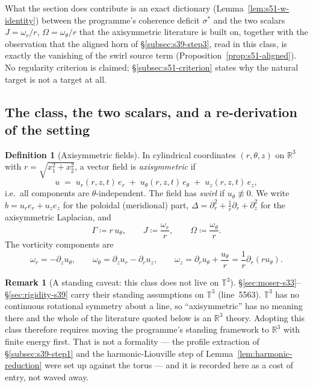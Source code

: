 \documentclass[11pt]{article}
\theoremstyle{definition}
\newtheorem{definition}[theorem]{Definition}
\newtheorem{remark}[theorem]{Remark}
\theoremstyle{remark}
\newcommand{\R}{\mathbb{R}}
\newcommand{\T}{\mathbb{T}}
\providecommand{\colonequals}{\coloneqq}
\begin{document}
\noindent What the section does contribute is an exact dictionary
(Lemma~\ref{lem:s51-w-identity}) between the programme's coherence deficit
$\sigma^*$ and the two scalars $J=\omega_r/r$, $\Omega=\omega_\theta/r$ that
the axisymmetric literature is built on, together with the observation that
the aligned horn of \S\ref{subsec:s39-step3}, read in this class, is exactly
the vanishing of the swirl source term (Proposition~\ref{prop:s51-aligned}).
No regularity criterion is claimed; \S\ref{subsec:s51-criterion} states why
the natural target is not a target at all.

\subsection{The class, the two scalars, and a re-derivation of the setting}
\label{subsec:s51-setting}

\begin{definition}[Axisymmetric fields]\label{def:s51-class}
  In cylindrical coordinates $(r,\theta,z)$ on $\R^3$ with
  $r=\sqrt{x_1^2+x_2^2}$, a vector field is \emph{axisymmetric} if
  \[
    u \;=\; u_r(r,z,t)\,e_r \;+\; u_\theta(r,z,t)\,e_\theta
      \;+\; u_z(r,z,t)\,e_z ,
  \]
  i.e.\ all components are $\theta$-independent. The field has \emph{swirl} if
  $u_\theta\not\equiv0$. We write $b=u_re_r+u_ze_z$ for the poloidal
  (meridional) part, $\Delta=\partial_r^2+\tfrac1r\partial_r+\partial_z^2$ for
  the axisymmetric Laplacian, and
  \[
    \Gamma \colonequals r\,u_\theta, \qquad
    J \colonequals \frac{\omega_r}{r}, \qquad
    \Omega \colonequals \frac{\omega_\theta}{r}.
  \]
  The vorticity components are
  \begin{equation}\label{eq:s51-vort}
    \omega_r=-\partial_zu_\theta,\qquad
    \omega_\theta=\partial_zu_r-\partial_ru_z,\qquad
    \omega_z=\partial_ru_\theta+\frac{u_\theta}{r}
      =\frac1r\partial_r(ru_\theta).
  \end{equation}
\end{definition}

\begin{remark}[A standing caveat: this class does not live on $\T^3$]
  \label{rem:s51-torus}
  \S\ref{sec:moser-s33}--\S\ref{sec:rigidity-s39} carry their standing
  assumptions on $\T^3$ (line~5563). $\T^3$ has no continuous rotational
  symmetry about a line, so ``axisymmetric'' has no meaning there and the
  whole of the literature quoted below is an $\R^3$ theory. Adopting this
  class therefore requires moving the programme's standing framework to
  $\R^3$ with finite energy first. That is not a formality --- the profile
  extraction of \S\ref{subsec:s39-step1} and the harmonic-Liouville step of
  Lemma~\ref{lem:harmonic-reduction} were set up against the torus --- and it
  is recorded here as a cost of entry, not waved away.
\end{remark}
\end{document}

